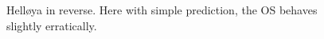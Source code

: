 \begin{figure}[ht]
\begin{subfigure}[b]{0.494\textwidth}
        \subcaption{}
    \end{subfigure}
    \hfill
    \caption{Helløya in reverse. Here with simple prediction, the \gls{OS} behaves slightly erratically.}
\end{figure}




\clearpage
